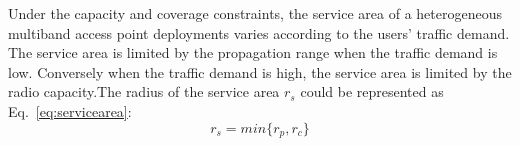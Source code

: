 

Under the capacity and coverage constraints, the service area of a heterogeneous multiband access point deployments
varies according to the users' traffic demand. The service area is limited by the propagation range when the traffic 
demand is low. Conversely when the traffic demand is high, the service area is limited by the radio capacity.The 
radius of the service area $r_s$ could be represented as Eq.~\ref{eq:servicearea}:
\begin{equation}
\label{eq:servicearea}
r_s=min\{r_p,r_c\}
\end{equation}

